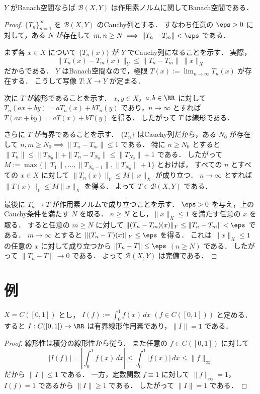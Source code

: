 \begin{theorem}
$Y$ がBanach空間ならば
$\mathcal B(X,Y)$ は作用素ノルムに関してBanach空間である．
\end{theorem}
\begin{proof}
$\{T_n\}_{n=1}^{\infty}$ を $\mathcal B(X,Y)$ のCauchy列とする．
すなわち任意の $\eps>0$ に対して，ある $N$ が存在して
$m,n\ge N \implies \|T_n-T_m\|<\eps$ である．

まず各 $x\in X$ について $\{T_n(x)\}$ が $Y$ でCauchy列になることを示す．
実際，
\[
\|T_n(x)-T_m(x)\|_Y
\le
\|T_n-T_m\|\,\|x\|_X
\]
だからである．
$Y$ はBanach空間なので，極限
$T(x):=\lim_{n\to\infty}T_n(x)$ が存在する．
こうして写像 $T:X\to Y$ が定まる．

次に $T$ が線形であることを示す．
$x,y\in X$，$a,b\in\RR$ に対して
$T_n(ax+by)=aT_n(x)+bT_n(y)$ であり，$n\to\infty$ とすれば
$T(ax+by)=aT(x)+bT(y)$ を得る．
したがって $T$ は線形である．

さらに $T$ が有界であることを示す．
$\{T_n\}$ はCauchy列だから，ある $N_0$ が存在して
$n,m\ge N_0 \implies \|T_n-T_m\|\le 1$ である．
特に $n\ge N_0$ とすると
$\|T_n\|\le \|T_{N_0}\|+\|T_n-T_{N_0}\|\le \|T_{N_0}\|+1$ である．
したがって
$M:=\max\{\|T_1\|,\dots,\|T_{N_0-1}\|,\|T_{N_0}\|+1\}$ とおけば，
すべての $n$ とすべての $x\in X$ に対して $\|T_n(x)\|_Y\le M\|x\|_X$ が成り立つ．
$n\to\infty$ とすれば
$\|T(x)\|_Y\le M\|x\|_X$ を得る．
よって $T\in\mathcal B(X,Y)$ である．

最後に $T_n\to T$ が作用素ノルムで成り立つことを示す．
$\eps>0$ を与え，上のCauchy条件を満たす $N$ を取る．
$n\ge N$ とし，$\|x\|_X\le 1$ を満たす任意の $x$ を取る．
すると任意の $m\ge N$ に対して
$\|(T_n-T_m)(x)\|_Y\le \|T_n-T_m\|<\eps$ である．
$m\to\infty$ とすると
$\|(T_n-T)(x)\|_Y\le \eps$ を得る．
これは $\|x\|_X\le 1$ の任意の $x$ に対して成り立つから
$\|T_n-T\|\le \eps$ $(n\ge N)$ である．
したがって $\|T_n-T\|\to 0$ である．
よって $\mathcal B(X,Y)$ は完備である．
\end{proof}

\section{例}

\begin{example}[積分型線形汎関数]
$X=C([0,1])$ とし，
$I(f):=\int_0^1 f(x)\,dx$ $(f\in C([0,1]))$ と定める．
すると
$I:C([0,1])\to \RR$ は有界線形作用素であり，$\|I\|=1$ である．
\end{example}
\begin{proof}
線形性は積分の線形性から従う．
また任意の $f\in C([0,1])$ に対して
\[
|I(f)|
=
\left|\int_0^1 f(x)\,dx\right|
\le
\int_0^1 |f(x)|\,dx
\le
\|f\|_\infty
\]
だから
$\|I\|\le 1$ である．
一方，定数関数 $f\equiv 1$ に対して
$\|f\|_\infty=1$，$I(f)=1$ であるから $\|I\|\ge 1$ である．
したがって $\|I\|=1$ である．
\end{proof}

